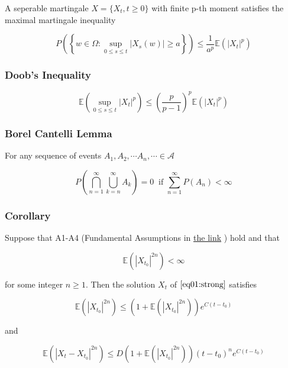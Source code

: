 \documentclass[]{article}
\begin{document}
A seperable martingale \(X = \{ X_t, t \geq 0 \}\) with finite p-th
moment satisfies the maximal martingale inequality

\[P \left( \left\{ w \in \Omega : \sup_{0 \leq s \leq t} \left | X_s (w) \right | \geq a \right\} \right) \leq \frac{1}{a^p} \mathbb{E} \left( \left | X_t \right |^p \right)
\label{eq02:appd}
\tag{A2}\]

\hypertarget{header-n132}{%
\subsubsection{Doob's Inequality}\label{header-n132}}

\[\mathbb{E} \left( \sup_{0 \leq s \leq t}  \left | X_t \right |^p \right)
\leq \left( \frac{p}{p-1} \right)^p \mathbb{E} \left( \left | X_t \right |^p \right)
\label{}
\label{eq03:appd}
\tag{A3}\]

\hypertarget{header-n134}{%
\subsubsection{Borel Cantelli Lemma}\label{header-n134}}

For any sequence of events
\(A_1, A_2, \cdots A_n, \cdots \in \mathcal{A}\)

\[P \left( \bigcap_{n=1}^{\infty} \bigcup_{k=n}^{\infty} A_k \right) = 0 \;\;\text{if } \sum_{n=1}^{\infty} P(A_n) < \infty\]

\hypertarget{header-n137}{%
\subsubsection{Corollary }\label{header-n137}}

Suppose that A1-A4 (Fundamental Assumptions in
\href{https://jinwuk.github.io/mathematics/stochastic\%20calculus/2018/11/25/Stochastic-Calculus-Important_Assumption_and_Lemma.html}{the
link} ) hold and that

\[\mathbb{E} \left( | X_{t_0} |^{2n} \right) < \infty\]

for some integer \( n \geq 1\). Then the solution \(X_t\) of
\(\eqref{eq01:strong}\) satisfies

\[\mathbb{E}\left(  \left | X_{t_0}  \right |^{2n} \right) \leq \left( 1 + \mathbb{E} \left( \left | X_{t_0} \right |^{2n} \right)\right) e^{C(t - t_0)}
\label{eq01:corollary}
\tag{C1}\]

and

\[\mathbb{E}\left(  \left |X_t -  X_{t_0}  \right |^{2n} \right) \leq D \left( 1 + \mathbb{E} \left( \left | X_{t_0} \right |^{2n} \right)\right) (t -t_0 )^n e^{C(t - t_0)}
\label{eq02:corollary}
\tag{C2}\]
\end{document}
